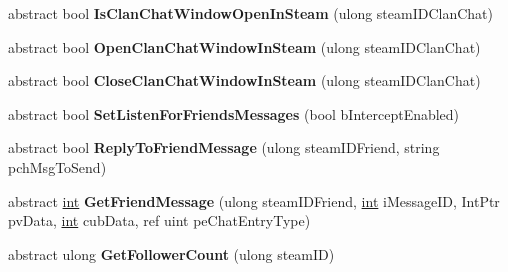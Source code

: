 \begin{DoxyCompactItemize}
\item 
\hypertarget{classValve_1_1Steamworks_1_1ISteamFriends_a183e79b5adb5081320798453d62d098d}{}abstract bool {\bfseries Is\+Clan\+Chat\+Window\+Open\+In\+Steam} (ulong steam\+I\+D\+Clan\+Chat)\label{classValve_1_1Steamworks_1_1ISteamFriends_a183e79b5adb5081320798453d62d098d}

\item 
\hypertarget{classValve_1_1Steamworks_1_1ISteamFriends_a8bde4c823088e6bd4d08774be62e4ad7}{}abstract bool {\bfseries Open\+Clan\+Chat\+Window\+In\+Steam} (ulong steam\+I\+D\+Clan\+Chat)\label{classValve_1_1Steamworks_1_1ISteamFriends_a8bde4c823088e6bd4d08774be62e4ad7}

\item 
\hypertarget{classValve_1_1Steamworks_1_1ISteamFriends_a0769011f523cc6b5f20310ba5f423597}{}abstract bool {\bfseries Close\+Clan\+Chat\+Window\+In\+Steam} (ulong steam\+I\+D\+Clan\+Chat)\label{classValve_1_1Steamworks_1_1ISteamFriends_a0769011f523cc6b5f20310ba5f423597}

\item 
\hypertarget{classValve_1_1Steamworks_1_1ISteamFriends_af8afcc207edbec99ecd2e0375952206b}{}abstract bool {\bfseries Set\+Listen\+For\+Friends\+Messages} (bool b\+Intercept\+Enabled)\label{classValve_1_1Steamworks_1_1ISteamFriends_af8afcc207edbec99ecd2e0375952206b}

\item 
\hypertarget{classValve_1_1Steamworks_1_1ISteamFriends_addd3660ba06c73d5456f3365bb683d7d}{}abstract bool {\bfseries Reply\+To\+Friend\+Message} (ulong steam\+I\+D\+Friend, string pch\+Msg\+To\+Send)\label{classValve_1_1Steamworks_1_1ISteamFriends_addd3660ba06c73d5456f3365bb683d7d}

\item 
\hypertarget{classValve_1_1Steamworks_1_1ISteamFriends_ad61c2e41e6aa54ef2f62dd97590d51df}{}abstract \hyperlink{SDL__thread_8h_a6a64f9be4433e4de6e2f2f548cf3c08e}{int} {\bfseries Get\+Friend\+Message} (ulong steam\+I\+D\+Friend, \hyperlink{SDL__thread_8h_a6a64f9be4433e4de6e2f2f548cf3c08e}{int} i\+Message\+I\+D, Int\+Ptr pv\+Data, \hyperlink{SDL__thread_8h_a6a64f9be4433e4de6e2f2f548cf3c08e}{int} cub\+Data, ref uint pe\+Chat\+Entry\+Type)\label{classValve_1_1Steamworks_1_1ISteamFriends_ad61c2e41e6aa54ef2f62dd97590d51df}

\item 
\hypertarget{classValve_1_1Steamworks_1_1ISteamFriends_a4599c21323d16902fbec55aa1897c868}{}abstract ulong {\bfseries Get\+Follower\+Count} (ulong steam\+I\+D)\label{classValve_1_1Steamworks_1_1ISteamFriends_a4599c21323d16902fbec55aa1897c868}


\end{DoxyCompactItemize}
